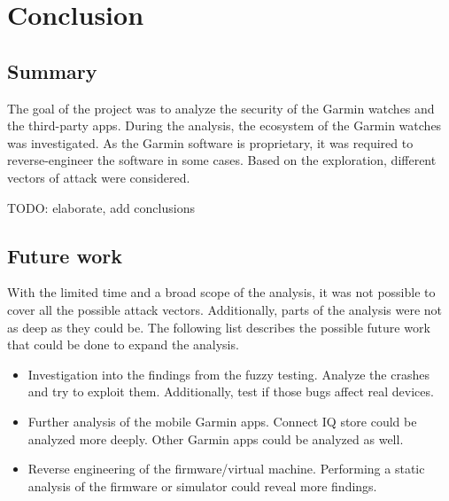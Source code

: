 \chapter{Conclusion}
\section{Summary}

The goal of the project was to analyze the security of the Garmin watches and the third-party apps.
During the analysis, the ecosystem of the Garmin watches was investigated.
As the Garmin software is proprietary, it was required to reverse-engineer the software in some cases.
Based on the exploration, different vectors of attack were considered.

TODO: elaborate, add conclusions


\section{Future work}

With the limited time and a broad scope of the analysis, it was not possible to cover all the possible attack vectors.
Additionally, parts of the analysis were not as deep as they could be.
The following list describes the possible future work that could be done to expand the analysis.

\begin{itemize}
    \item Investigation into the findings from the fuzzy testing.
    Analyze the crashes and try to exploit them.
    Additionally, test if those bugs affect real devices.
    \item Further analysis of the mobile Garmin apps.
    Connect IQ store could be analyzed more deeply.
    Other Garmin apps could be analyzed as well.
    \item Reverse engineering of the firmware/virtual machine.
    Performing a static analysis of the firmware or simulator could reveal more findings.
\end{itemize}